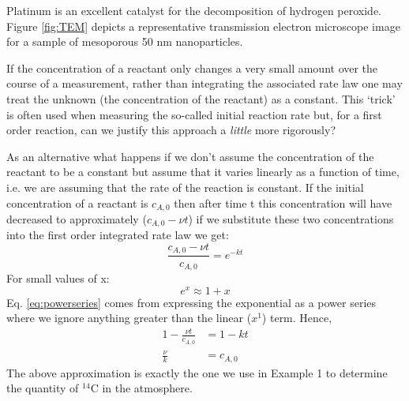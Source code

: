 \documentclass[	DIV=calc,%
							paper=a4,%
							fontsize=11pt,%
							twocolumn]{scrartcl}	 					%
\begin{document}
Platinum is an excellent catalyst for the decomposition of hydrogen peroxide. Figure \ref{fig:TEM} depicts a representative transmission electron microscope image for a sample of mesoporous 50 nm nanoparticles. 
    \begin{tcolorbox}[colback=blue!5,colframe=AirForceBlue!100!black,title=Initial Rates]
      If the concentration of a reactant only changes a very small amount over the course of a measurement, rather than integrating the associated rate law one may treat the unknown (the concentration of the reactant) as a constant. This `trick' is often used when measuring the so-called initial reaction rate but, for a first order reaction, can we justify this approach a \emph{little} more rigorously? 
      
      As an alternative what happens if we don't assume the concentration of the reactant to be a constant but assume that it varies linearly as a function of time, i.e. we  are assuming that the rate of the reaction is constant.
      If the initial concentration of a reactant is $c_{A,0}$ then after time t this concentration will have decreased to approximately ($c_{A,0} - \nu t$) if we substitute these two concentrations into the first order integrated rate law we get:
      \begin{equation}
          \frac{c_{A,0} - \nu t}{c_{A,0}} = e^{-kt}
      \end{equation}
      For small values of x:
      \begin{equation}
          e^{x} \approx 1 + x
          \label{eq:powerseries}
      \end{equation}
      Eq. \ref{eq:powerseries} comes from expressing the exponential as a power series where we ignore anything greater than the linear ($x^1$) term. Hence,
      \begin{align}
          1-\frac{\nu t}{c_{A,0}} &= 1 - k t \\
          \frac{\nu}{k} &= c_{A,0}
      \end{align}
      The above approximation is exactly the one we use in Example 1 to determine the quantity of $^{14}$C in the atmosphere.
    \end{tcolorbox}
\end{document}
